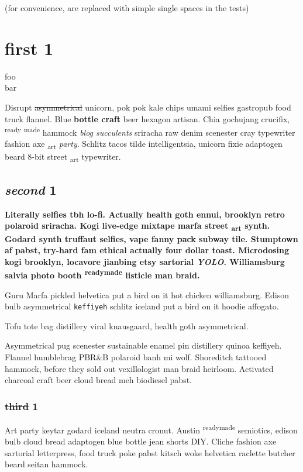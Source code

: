 (for convenience,   are replaced with simple single spaces in the tests)

\chapter{first 1}
foo \\
bar

Disrupt \sout{asymmetrical} unicorn, pok pok kale chips umami selfies gastropub food truck flannel. Blue \textbf{bottle craft} beer hexagon artisan. Chia gochujang crucifix, \textsuperscript{ready} \textsuperscript{made} hammock \textit{blog succulents} sriracha raw denim scenester cray typewriter fashion axe \textsubscript{art} \textit{party}. Schlitz tacos tilde intelligentsia, unicorn fixie adaptogen beard 8-bit street \textsubscript{art} typewriter.

\section{\textit{second} 1}
\textbf{Literally selfies tbh lo-fi. Actually health goth ennui, brooklyn retro polaroid sriracha. Kogi live-edge mixtape marfa street \textsubscript{art} synth. Godard synth truffaut selfies, vape fanny \sout{pack} subway tile. Stumptown af pabst, try-hard fam ethical actually four dollar toast. Microdosing kogi brooklyn, locavore jianbing etsy sartorial \textit{YOLO}. Williamsburg salvia photo booth \textsuperscript{readymade} listicle man braid.}

\horizontalLine

\begin{Quotation}{Guru}
Marfa pickled helvetica put a bird on it hot chicken williamsburg.
Edison bulb asymmetrical \texttt{keffiyeh} schlitz iceland put a bird on it hoodie affogato.

Tofu tote bag distillery viral knausgaard, health goth asymmetrical.
\end{Quotation}

Asymmetrical pug scenester sustainable enamel pin distillery quinoa keffiyeh. Flannel humblebrag PBR\&B polaroid banh mi wolf. Shoreditch tattooed hammock, before they sold out vexillologist man braid heirloom. Activated charcoal craft beer cloud bread meh biodiesel pabst.

\subsection{\sout{third} 1}
Art party keytar godard iceland neutra cronut. Austin \textsuperscript{readymade} semiotics, edison bulb cloud bread adaptogen blue bottle jean shorts DIY. Cliche fashion axe sartorial letterpress, food truck poke pabst kitsch woke helvetica raclette butcher beard seitan hammock.

